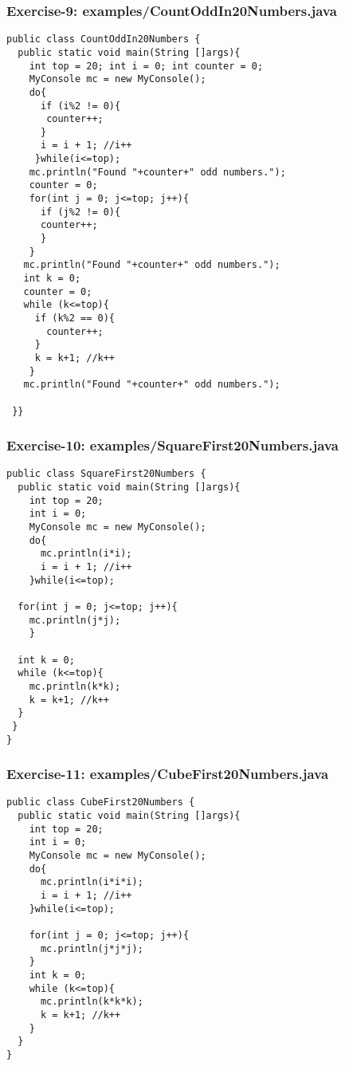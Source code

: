 \documentclass[xcolor=dvipsnames,dvip,notes=show,table]{beamer}
\begin{document}
\begin{frame}[fragile]
\frametitle{Exercise-9: examples/CountOddIn20Numbers.java}
\tiny
\begin{lstlisting}
public class CountOddIn20Numbers {
  public static void main(String []args){
    int top = 20; int i = 0; int counter = 0;
    MyConsole mc = new MyConsole();
    do{
      if (i%2 != 0){
       counter++;
      }
      i = i + 1; //i++
     }while(i<=top);				
    mc.println("Found "+counter+" odd numbers.");
    counter = 0;
    for(int j = 0; j<=top; j++){
      if (j%2 != 0){
      counter++;
      }
    }
   mc.println("Found "+counter+" odd numbers.");
   int k = 0;
   counter = 0;
   while (k<=top){
     if (k%2 == 0){
       counter++;
     }
     k = k+1; //k++
    }
   mc.println("Found "+counter+" odd numbers.");

 }}
\end{lstlisting}
\end{frame}






\begin{frame}[fragile]
\frametitle{Exercise-10: examples/SquareFirst20Numbers.java}
\tiny
\begin{lstlisting}
public class SquareFirst20Numbers {
  public static void main(String []args){
    int top = 20;
    int i = 0;
    MyConsole mc = new MyConsole();
    do{
      mc.println(i*i);
      i = i + 1; //i++
    }while(i<=top);
  
  for(int j = 0; j<=top; j++){
    mc.println(j*j);
    }

  int k = 0;
  while (k<=top){
    mc.println(k*k);
    k = k+1; //k++
  }
 }
}
\end{lstlisting}
\end{frame}




\begin{frame}[fragile]
\frametitle{Exercise-11: examples/CubeFirst20Numbers.java}
\tiny
\begin{lstlisting}
public class CubeFirst20Numbers {
  public static void main(String []args){
    int top = 20;
    int i = 0;
    MyConsole mc = new MyConsole();
    do{
      mc.println(i*i*i);
      i = i + 1; //i++
    }while(i<=top);

    for(int j = 0; j<=top; j++){
      mc.println(j*j*j);
    }
    int k = 0;
    while (k<=top){
      mc.println(k*k*k);
      k = k+1; //k++
    }
  }
}
\end{lstlisting}
\end{frame}
\end{document}
